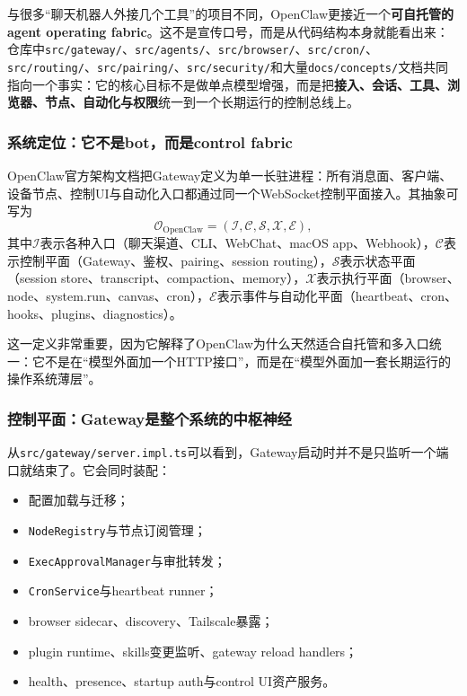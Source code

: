 \documentclass[12pt,a4paper]{article}
\begin{document}
与很多“聊天机器人外接几个工具”的项目不同，OpenClaw更接近一个\textbf{可自托管的agent operating fabric}。这不是宣传口号，而是从代码结构本身就能看出来：仓库中\texttt{src/gateway/}、\texttt{src/agents/}、\texttt{src/browser/}、\texttt{src/cron/}、\texttt{src/routing/}、\texttt{src/pairing/}、\texttt{src/security/}和大量\texttt{docs/concepts/}文档共同指向一个事实：它的核心目标不是做单点模型增强，而是把\textbf{接入、会话、工具、浏览器、节点、自动化与权限}统一到一个长期运行的控制总线上。

\subsubsection{系统定位：它不是bot，而是control fabric}

OpenClaw官方架构文档把Gateway定义为单一长驻进程：所有消息面、客户端、设备节点、控制UI与自动化入口都通过同一个WebSocket控制平面接入。其抽象可写为
\begin{equation}
\mathcal{O}_{\text{OpenClaw}}
=
(\mathcal{I}, \mathcal{C}, \mathcal{S}, \mathcal{X}, \mathcal{E}),
\end{equation}
其中$\mathcal{I}$表示各种入口（聊天渠道、CLI、WebChat、macOS app、Webhook），$\mathcal{C}$表示控制平面（Gateway、鉴权、pairing、session routing），$\mathcal{S}$表示状态平面（session store、transcript、compaction、memory），$\mathcal{X}$表示执行平面（browser、node、system.run、canvas、cron），$\mathcal{E}$表示事件与自动化平面（heartbeat、cron、hooks、plugins、diagnostics）。

这一定义非常重要，因为它解释了OpenClaw为什么天然适合自托管和多入口统一：它不是在“模型外面加一个HTTP接口”，而是在“模型外面加一套长期运行的操作系统薄层”。

\subsubsection{控制平面：Gateway是整个系统的中枢神经}

从\texttt{src/gateway/server.impl.ts}可以看到，Gateway启动时并不是只监听一个端口就结束了。它会同时装配：
\begin{itemize}
    \item 配置加载与迁移；
    \item \texttt{NodeRegistry}与节点订阅管理；
    \item \texttt{ExecApprovalManager}与审批转发；
    \item \texttt{CronService}与heartbeat runner；
    \item browser sidecar、discovery、Tailscale暴露；
    \item plugin runtime、skills变更监听、gateway reload handlers；
    \item health、presence、startup auth与control UI资产服务。
\end{itemize}
\end{document}
